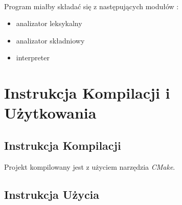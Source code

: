 \documentclass[11pt]{article} %
\begin{document}
\paragraph{}
Program miałby składać się z następujących modułów : 
\begin{itemize}
	\item analizator leksykalny
	\item analizator składniowy
	\item interpreter
\end{itemize}

\section{Instrukcja Kompilacji i Użytkowania}
\subsection{Instrukcja Kompilacji}
Projekt kompilowany jest z użyciem narzędzia \textsl{CMake}.
	
\subsection{Instrukcja Użycia}
\end{document}
